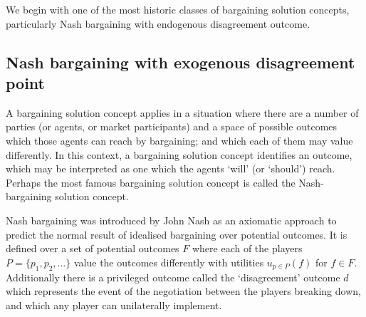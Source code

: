 We begin with one of the most historic classes of bargaining solution concepts, particularly Nash bargaining with endogenous disagreement outcome.

\subsection{Nash bargaining with exogenous disagreement point}\label{sec:nash_bargaining_exogenous}




A bargaining solution concept applies in a situation where there are a number of parties (or agents, or market participants) and a space of possible outcomes which those agents can reach by bargaining; and which each of them may value differently.
In this context, a bargaining solution concept identifies an outcome, which may be interpreted as one which the agents `will' (or `should') reach.
Perhaps the most famous bargaining solution concept is called the Nash-bargaining solution concept.

Nash bargaining was introduced by John Nash \citep{nash1} as an axiomatic approach to predict the normal result of idealised bargaining over potential outcomes.
It is defined over a set of potential outcomes $F$ %
where each of the players $P=\{p_1,p_2,\dots\}$ value the outcomes differently with utilities $u_{p\in P}(f)$ for $f\in F$.
Additionally there is a privileged outcome called the `disagreement' outcome $d$ which represents the event of the negotiation between the players breaking down, and which any player can unilaterally implement.

